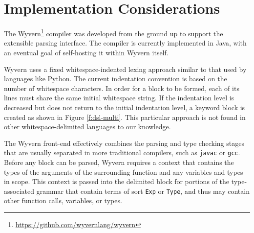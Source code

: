 \section{Implementation Considerations}
\label{s:implementation}

The Wyvern\footnote{\url{https://github.com/wyvernlang/wyvern}} compiler
was developed from the ground up to support the extensible parsing
interface. The compiler is currently implemented in Java, with an eventual goal of self-hosting it within Wyvern itself.

Wyvern uses a fixed whitespace-indented lexing approach similar to that used by languages like Python. The current indentation convention is based on the number of whitespace characters. In order for a block to be formed, each of its lines must share the same initial whitespace string. If the indentation level is decreased but does not return to the initial indentation level, a keyword block is created as shown in Figure \ref{f:dsl-multi}. This particular approach is not found in other whitespace-delimited languages to our knowledge.

The Wyvern front-end effectively combines the parsing and type checking
stages that are usually separated in more traditional compilers, such
as \texttt{javac} or \texttt{gcc}. Before any block can be parsed,
Wyvern requires a context that contains the types of the arguments of the surrounding function and any variables and types in scope. This context is passed into the delimited block for portions of the type-associated grammar that contain terms of sort \verb|Exp| or \verb|Type|, and thus may contain other function calls, variables, or types. 

%


